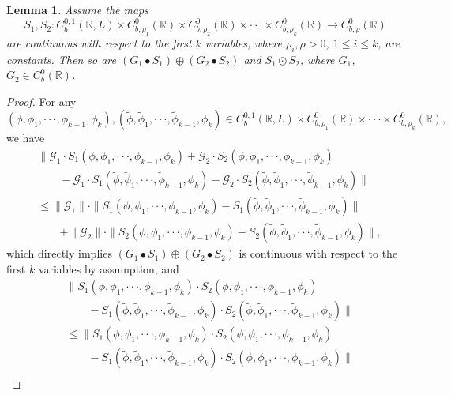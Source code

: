 \documentclass[11pt,reqno,a4paper]{amsart}
\newtheorem{lemma}{Lemma}
\numberwithin{equation}{section}
\begin{document}
\begin{lemma}\label{lm-operation}
 Assume the maps 
 $$S_1, S_2: C_{b}^{0,1}(\mathbb{R},L) \times C_{b,\rho_1}^0(\mathbb{R})  \times C_{b,\rho_2}^0(\mathbb{R})\times \cdot \cdot \cdot \times C_{b,\rho_k}^0(\mathbb{R})  \rightarrow C^0_{b,\rho}(\mathbb{R})$$
 are continuous with respect to the first $k$ variables, where $\rho_i,\rho>0$, $1\le i\le k$, are  constants. Then so are $(G_1 \bullet S_1) \oplus
 (G_2\bullet S_2)$ and $S_1\odot S_2$, where $G_1$, $G_2 \in C_{b}^{0}(\mathbb{R})$.
\end{lemma}
\begin{proof}[Proof]
For any $(\phi,\phi_1,\cdot \cdot \cdot,\phi_{k-1},\phi_{k}), (\tilde{\phi},\tilde{\phi}_1,\cdot \cdot \cdot,\tilde{\phi}_{k-1},\phi_{k}) \in C_{b}^{0,1}(\mathbb{R},L) \times C_{b,\rho_1}^0(\mathbb{R})\times \cdot \cdot \cdot \times C_{b,\rho_k}^0(\mathbb{R}) ,$ we have 
\begin{align*}
&\|\mathcal{G}_1 \cdot S_1(\phi,\phi_1,\cdot \cdot \cdot,\phi_{k-1},\phi_{k})+\mathcal{G}_2 \cdot S_2(\phi,\phi_1,\cdot \cdot \cdot,\phi_{k-1},\phi_{k})\\
&\qquad-\mathcal{G}_1 \cdot S_1(\tilde{\phi},\tilde{\phi}_1,\cdot \cdot \cdot,\tilde{\phi}_{k-1},\phi_{k})-\mathcal{G}_2 \cdot S_2(\tilde{\phi},\tilde{\phi}_1,\cdot \cdot \cdot,\tilde{\phi}_{k-1},\phi_{k})\|\\
&\le \|\mathcal{G}_1\|\cdot\|S_1(\phi,\phi_1,\cdot \cdot \cdot,\phi_{k-1},\phi_{k})-S_1(\tilde{\phi},\tilde{\phi}_1,\cdot \cdot \cdot,\tilde{\phi}_{k-1},\phi_{k})\|\\
&\qquad+\|\mathcal{G}_2\|\cdot \|S_2(\phi,\phi_1,\cdot \cdot \cdot,\phi_{k-1},\phi_{k})-S_2(\tilde{\phi},\tilde{\phi}_1,\cdot \cdot \cdot,\tilde{\phi}_{k-1},\phi_{k})\|,
\end{align*}
which directly implies $(G_1 \bullet S_1) \oplus
 (G_2\bullet S_2)$ is continuous  with respect to the first $k$ variables by assumption,
and 
\begin{align*}
&\|S_1(\phi,\phi_1,\cdot \cdot \cdot,\phi_{k-1},\phi_{k}) \cdot S_2(\phi,\phi_1,\cdot \cdot \cdot,\phi_{k-1},\phi_{k})\\
&\qquad-S_1(\tilde{\phi},\tilde{\phi}_1,\cdot \cdot \cdot,\tilde{\phi}_{k-1},\phi_{k}) \cdot S_2(\tilde{\phi},\tilde{\phi}_1,\cdot \cdot \cdot,\tilde{\phi}_{k-1},\phi_{k})\|\\
&\le \|S_1(\phi,\phi_1,\cdot \cdot \cdot,\phi_{k-1},\phi_{k}) \cdot S_2(\phi,\phi_1,\cdot \cdot \cdot,\phi_{k-1},\phi_{k})\\
&\qquad -S_1(\tilde{\phi},\tilde{\phi}_1,\cdot \cdot \cdot,\tilde{\phi}_{k-1},\phi_{k}) \cdot S_2(\phi,\phi_1,\cdot \cdot \cdot,\phi_{k-1},\phi_{k})\|\\

\end{align*}
\end{proof}
\end{document}
